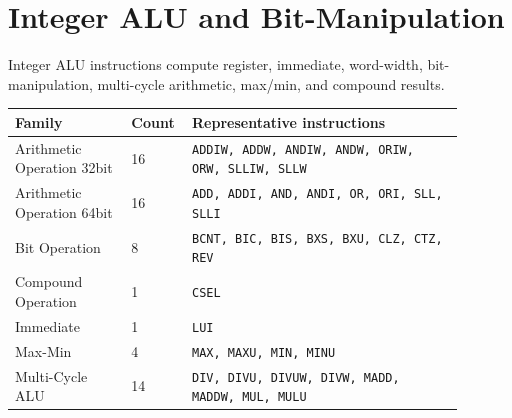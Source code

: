 \section{Integer ALU and Bit-Manipulation}
Integer ALU instructions compute register, immediate, word-width, bit-manipulation, multi-cycle arithmetic, max/min, and compound results.\par\smallskip
{\scriptsize
\begin{longtable}{@{}L{0.24\linewidth}R{0.09\linewidth}L{0.56\linewidth}@{}}
\toprule
Family & Count & Representative instructions \\
\midrule
Arithmetic Operation 32bit & 16 & \texttt{ADDIW, ADDW, ANDIW, ANDW, ORIW, ORW, SLLIW, SLLW} \\
Arithmetic Operation 64bit & 16 & \texttt{ADD, ADDI, AND, ANDI, OR, ORI, SLL, SLLI} \\
Bit Operation & 8 & \texttt{BCNT, BIC, BIS, BXS, BXU, CLZ, CTZ, REV} \\
Compound Operation & 1 & \texttt{CSEL} \\
Immediate & 1 & \texttt{LUI} \\
Max-Min & 4 & \texttt{MAX, MAXU, MIN, MINU} \\
Multi-Cycle ALU & 14 & \texttt{DIV, DIVU, DIVUW, DIVW, MADD, MADDW, MUL, MULU} \\
\bottomrule
\end{longtable}
}

